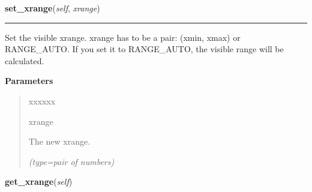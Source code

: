     \label{pygtk_chart:line_chart:LineChart:set_xrange}

    \vspace{0.5ex}

\hspace{.8\funcindent}\begin{boxedminipage}{\funcwidth}

    \raggedright \textbf{set\_xrange}(\textit{self}, \textit{xrange})

    \vspace{-1.5ex}

    \rule{\textwidth}{0.5\fboxrule}
\setlength{\parskip}{2ex}
    Set the visible xrange. xrange has to be a pair: (xmin, xmax) or 
    RANGE\_AUTO. If you set it to RANGE\_AUTO, the visible range will be 
    calculated.

\setlength{\parskip}{1ex}
      \textbf{Parameters}
      \vspace{-1ex}

      \begin{quote}
        \begin{Ventry}{xxxxxx}

          \item[xrange]

          The new xrange.

            {\it (type=pair of numbers)}

        \end{Ventry}

      \end{quote}

    \end{boxedminipage}

    \label{pygtk_chart:line_chart:LineChart:get_xrange}

    \vspace{0.5ex}

\hspace{.8\funcindent}\begin{boxedminipage}{\funcwidth}

    \raggedright \textbf{get\_xrange}(\textit{self})

\setlength{\parskip}{2ex}
\setlength{\parskip}{1ex}
    \end{boxedminipage}

